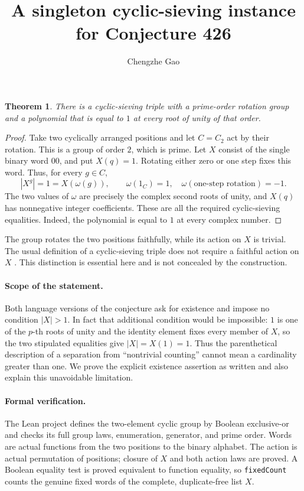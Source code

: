 \documentclass[11pt]{article}
\newtheorem{theorem}{Theorem}
\begin{document}
\title{A singleton cyclic-sieving instance for Conjecture 426}
\author{Chengzhe Gao}\date{}\maketitle
\begin{theorem}
There is a cyclic-sieving triple with a prime-order rotation group and
a polynomial that is equal to $1$ at every root of unity of that order.
\end{theorem}
\begin{proof}
Take two cyclically arranged positions and let $C=C_2$ act by their
rotation. This is a group of order $2$, which is prime. Let $X$ consist
of the single binary word $00$, and put $X(q)=1$. Rotating either zero
or one step fixes this word. Thus, for every $g\in C$,
\[
 |X^g|=1=X(\omega(g)), \qquad \omega(1_C)=1,\quad
 \omega(\text{one-step rotation})=-1.
\]
The two values of $\omega$ are precisely the complex second roots of
unity, and $X(q)$ has nonnegative integer coefficients. These are all
the required cyclic-sieving equalities. Indeed, the polynomial is
equal to $1$ at every complex number.
\end{proof}

The group rotates the two positions faithfully, while its action on
$X$ is trivial. The usual definition of a cyclic-sieving triple does
not require a faithful action on $X$ \cite{RSW}. This distinction is
essential here and is not concealed by the construction.

\paragraph{Scope of the statement.}
Both language versions of the conjecture ask for existence and impose
no condition $|X|>1$. In fact that additional condition would be
impossible: $1$ is one of the $p$-th roots of unity and the identity
element fixes every member of $X$, so the two stipulated equalities
give $|X|=X(1)=1$. Thus the parenthetical description of a separation
from ``nontrivial counting'' cannot mean a cardinality greater than
one. We prove the explicit existence assertion as written and also
explain this unavoidable limitation.

\paragraph{Formal verification.}
The Lean project defines the two-element cyclic group by Boolean
exclusive-or and checks its full group laws, enumeration, generator,
and prime order. Words are actual functions from the two positions to
the binary alphabet. The action is actual permutation of positions;
closure of $X$ and both action laws are proved. A Boolean equality
test is proved equivalent to function equality, so
\texttt{fixedCount} counts the genuine fixed words of the complete,
duplicate-free list $X$.
\end{document}
